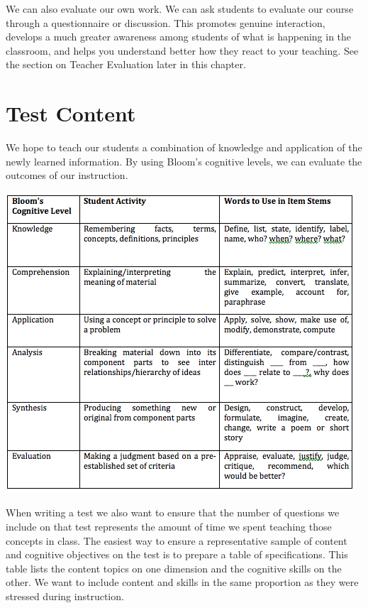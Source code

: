 We can also evaluate our own work.  We can ask students to evaluate our course through a questionnaire or discussion.  This promotes genuine interaction, develops a much greater awareness among students of what is happening in the classroom, and helps you understand better how they react to your teaching. See the section on Teacher Evaluation later in this chapter.

\pagebreak
\section{Test Content}

We hope to teach our students a combination of knowledge and application of the newly learned information.  By using Bloom's cognitive levels, we can evaluate the outcomes of our instruction.

\begin{center}
\includegraphics[scale=.7]{./img/picture-8.png} 
\end{center}

When writing a test we also want to ensure that the number of questions we include on that test represents the amount of time we spent teaching those concepts in class.  The easiest way to ensure a representative sample of content and cognitive objectives on the test is to prepare a table of specifications. This table lists the content topics on one dimension and the cognitive skills on the other. We want to include content and skills in the same proportion as they were stressed during instruction.\\

